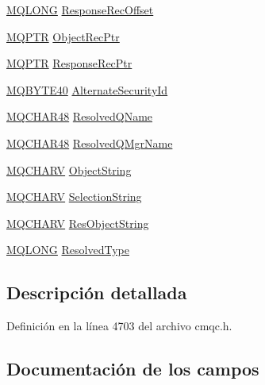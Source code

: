 \begin{DoxyCompactItemize}
\item 
\hyperlink{cmqc_8h_a1fb8d28cbda3fa8766a9821230cdb6d5}{M\+Q\+L\+O\+N\+G} \hyperlink{structtag_m_q_o_d_a944cab1325e5696fccf9202988c81066}{Response\+Rec\+Offset}
\item 
\hyperlink{cmqc_8h_a0b835d8e479d7c42242ed9c6b6572f5a}{M\+Q\+P\+T\+R} \hyperlink{structtag_m_q_o_d_aa46059ff8062713d03173a8847594a25}{Object\+Rec\+Ptr}
\item 
\hyperlink{cmqc_8h_a0b835d8e479d7c42242ed9c6b6572f5a}{M\+Q\+P\+T\+R} \hyperlink{structtag_m_q_o_d_a3f96e15a2299a7c139b78c4e1b8cb7cb}{Response\+Rec\+Ptr}
\item 
\hyperlink{cmqc_8h_a1674aecfb9c9ab107699326ec31c4944}{M\+Q\+B\+Y\+T\+E40} \hyperlink{structtag_m_q_o_d_adc1f3b4aa3c6e3f3187e75291146cae7}{Alternate\+Security\+Id}
\item 
\hyperlink{cmqc_8h_a53b1a2836da03f19144836725ff77919}{M\+Q\+C\+H\+A\+R48} \hyperlink{structtag_m_q_o_d_aec4a06d696b4370f0c86b129d9f868ca}{Resolved\+Q\+Name}
\item 
\hyperlink{cmqc_8h_a53b1a2836da03f19144836725ff77919}{M\+Q\+C\+H\+A\+R48} \hyperlink{structtag_m_q_o_d_af36c1b6e6f3f92e0c733c43da9fada3f}{Resolved\+Q\+Mgr\+Name}
\item 
\hyperlink{cmqc_8h_a2a61029e155515c1360dfc809dab6747}{M\+Q\+C\+H\+A\+R\+V} \hyperlink{structtag_m_q_o_d_a564791473371222ceb856cfaf02d6f91}{Object\+String}
\item 
\hyperlink{cmqc_8h_a2a61029e155515c1360dfc809dab6747}{M\+Q\+C\+H\+A\+R\+V} \hyperlink{structtag_m_q_o_d_ab3a91014a229bd897c17cbd04563bca2}{Selection\+String}
\item 
\hyperlink{cmqc_8h_a2a61029e155515c1360dfc809dab6747}{M\+Q\+C\+H\+A\+R\+V} \hyperlink{structtag_m_q_o_d_a8f35fe6f52369753de1259a9468437eb}{Res\+Object\+String}
\item 
\hyperlink{cmqc_8h_a1fb8d28cbda3fa8766a9821230cdb6d5}{M\+Q\+L\+O\+N\+G} \hyperlink{structtag_m_q_o_d_ab1523b449e77139034581b4e5f7c4201}{Resolved\+Type}
\end{DoxyCompactItemize}


\subsection{Descripción detallada}


Definición en la línea 4703 del archivo cmqc.\+h.



\subsection{Documentación de los campos}
\hypertarget{structtag_m_q_o_d_adc1f3b4aa3c6e3f3187e75291146cae7}{}
